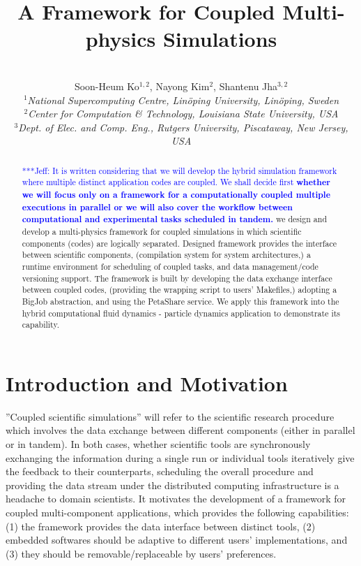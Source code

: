 \documentclass[10pt,conference]{IEEEtran}
\title{A Framework for Coupled Multi-physics Simulations \skonote{some charming title?? 
emphasizing ''it can cover various kinds of applications in different requirement, 
main components can be replaced by other similar softwares, etc.''} }
\author{
 ~\\[-2em]
 Soon-Heum Ko$^{1,2}$, Nayong Kim$^{2}$, Shantenu Jha$^{3,2}$\\
 \small{\emph{$^{1}$National Supercomputing Centre, Lin\"{o}ping University, Lin\"{o}ping, Sweden}}\\
 \small{\emph{$^{2}$Center for Computation \& Technology, Louisiana State University, USA}}\\
 \small{\emph{$^{3}$Dept. of Elec. and Comp. Eng., Rutgers University, Piscataway, New Jersey, USA}}\\
}
\newcommand{\skonote}[1]{ {\textcolor{blue} { ***Jeff: #1 }}}
\newcommand{\skonote}[1]{}
\newcommand{\up}{\vspace*{-1em}}
\begin{document}
\maketitle

\begin{abstract}
\skonote{It is written considering that we will develop the hybrid 
simulation framework where multiple distinct application codes are coupled.
We shall decide first \textbf{whether we will focus only on a framework for 
a computationally coupled multiple executions in parallel or 
we will also cover the workflow between computational and 
experimental tasks scheduled in tandem.}}
we design and develop a multi-physics framework for coupled simulations
in which scientific components (codes) are logically separated.
Designed framework provides the interface between scientific components,
(compilation system for system architectures,)
a runtime environment for scheduling of coupled tasks, and
data management/code versioning support.
The framework is built by developing the data exchange interface 
between coupled codes, (providing the wrapping script to users' Makefiles,)
adopting a BigJob abstraction, and using the PetaShare service.
We apply this framework into the hybrid computational fluid dynamics -
particle dynamics application to demonstrate its capability.
\end{abstract}
\up\up

\section{Introduction and Motivation}

''Coupled scientific simulations'' will refer to the scientific 
research procedure which involves the data exchange between
different components (either in parallel or in tandem). In both cases,
whether scientific tools are synchronously exchanging the information 
during a single run or individual tools iteratively give the feedback
to their counterparts, scheduling the overall procedure and
providing the data stream under the distributed computing infrastructure
is a headache to domain scientists. It motivates the development of
a framework for coupled multi-component applications,
which provides the following capabilities:
(1) the framework provides the data interface between distinct tools,
(2) embedded softwares should be adaptive to different users' implementations, and 
(3) they should be removable/replaceable by users' preferences.
\end{document}
